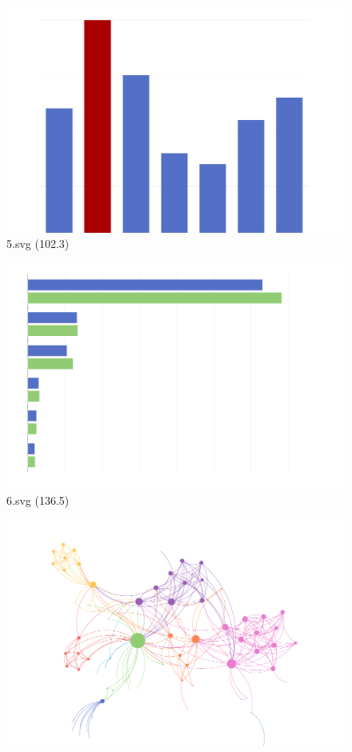 \documentclass[journal]{IEEEtran}
\begin{document}
\begin{figure}[!htbp]
\centering
\begin{minipage}{0.233\columnwidth}
\centering
\includegraphics[width=\textwidth]{Test_set/5.pdf}
{5.svg (102.3)}
\end{minipage}
\hfill
\begin{minipage}{0.233\columnwidth}
\centering
\includegraphics[width=\textwidth]{Test_set/6.pdf}
{6.svg (136.5)}
\end{minipage}
\hfill
\begin{minipage}{0.233\columnwidth}
\centering
\includegraphics[width=\textwidth]{Test_set/7.pdf}

\end{minipage}
\end{figure}
\end{document}
